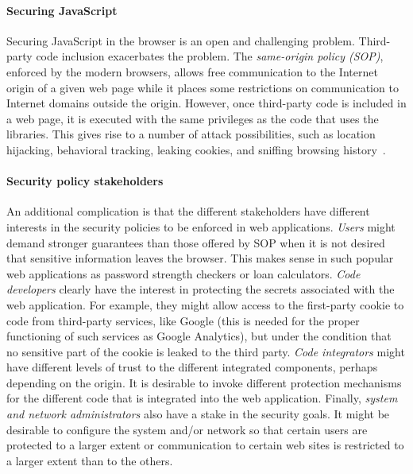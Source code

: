 \documentclass{llncs}
\begin{document}
\paragraph{Securing JavaScript}
Securing JavaScript in the browser is an open and challenging
problem. Third-party code inclusion exacerbates the
problem. The \emph{same-origin policy (SOP)}, enforced by the modern
browsers, allows free communication to the Internet origin of a given web page 
while it
places some restrictions on communication to Internet domains
outside the origin. However, once third-party code is
included in a web page, it is executed with the same privileges as the code
that uses the libraries. This gives rise to a number of attack possibilities,
such as location
hijacking, behavioral tracking, leaking cookies, and sniffing browsing history~\cite{Jang+:CCS10}. 

\paragraph{Security policy stakeholders}
An additional complication is that the different stakeholders have
different interests in the security policies to be enforced
in web applications. 
%
\emph{Users} might demand stronger guarantees than those
offered by SOP when it is not desired that sensitive information leaves
the browser. This makes sense in such popular web applications as
password strength checkers or loan
calculators.
%
\emph{Code developers} clearly have the interest in protecting the
secrets associated with the web application. For example, they might
allow access to the first-party cookie to code from third-party
services, like Google (this is needed for the proper functioning of
such services
as Google Analytics), but under the condition that no sensitive part
of the cookie is leaked to the third party.
%
\emph{Code integrators} might have different levels of trust to the
different integrated components, perhaps depending on the origin. It
is desirable to invoke different protection mechanisms for the
different code that is integrated into the web application.
%
Finally, \emph{system and network administrators} also have a
stake in the security goals. It might be desirable to configure the
system and/or network so that certain users are protected to a larger
extent or communication to certain web sites is restricted to a larger
extent than to the others.  
\end{document}
